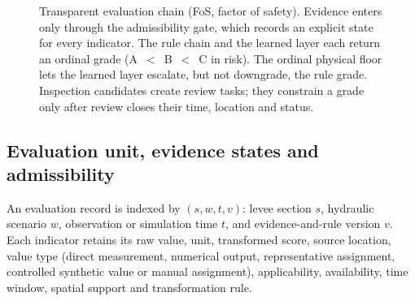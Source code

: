 \documentclass[journal]{IEEEtran}
\begin{document}
\begin{figure}[t]
\caption{Transparent evaluation chain (FoS, factor of safety). Evidence enters only through the admissibility gate, which records an explicit state for every indicator. The rule chain and the learned layer each return an ordinal grade (A~$<$~B~$<$~C in risk). The ordinal physical floor lets the learned layer escalate, but not downgrade, the rule grade. Inspection candidates create review tasks; they constrain a grade only after review closes their time, location and status.}
\label{fig:framework}
\end{figure}

\subsection{Evaluation unit, evidence states and admissibility}
\label{sec:states}
An evaluation record is indexed by $(s,w,t,v)$: levee section $s$, hydraulic scenario $w$, observation or simulation time $t$, and evidence-and-rule version $v$. Each indicator retains its raw value, unit, transformed score, source location, value type (direct measurement, numerical output, representative assignment, controlled synthetic value or manual assignment), applicability, availability, time window, spatial support and transformation rule.
\end{document}
